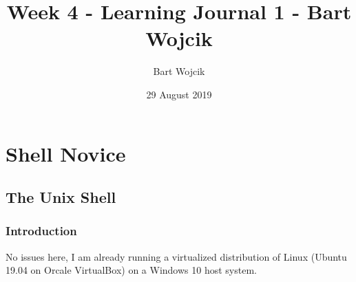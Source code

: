 \documentclass{article}
\title{Week 4 - Learning Journal 1  - Bart Wojcik}
\author{Bart Wojcik}
\date{29 August 2019}
\begin{document}
\maketitle

\section{Shell Novice}
\subsection{The Unix Shell}
\subsubsection{Introduction}
No issues here, I am already running a virtualized distribution of Linux (Ubuntu 19.04 on Orcale VirtualBox) on a Windows 10 host system.
\end{document}

